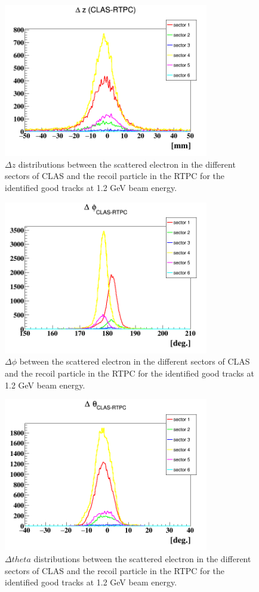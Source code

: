 \begin{figure}[tbp]
\centering
\includegraphics[height=6.7cm]{fig/delta_z_sec.png}
\caption{$\Delta z$ distributions between the scattered electron in the 
different sectors of CLAS and the recoil particle in the RTPC for the 
identified good tracks at 1.2 GeV beam energy.}
\label{fig:delta_z_sec}
 \end{figure}


\begin{figure}[tbp]
\centering
\includegraphics[height=6.7cm]{fig/delta_phi_sec.png}
\caption{ $\Delta \phi$ between the scattered electron in the different sectors 
of CLAS and the recoil particle in the RTPC for the identified good tracks at 
1.2 GeV beam energy.}
\label{fig:delta_phi_sec}
 \end{figure}


\begin{figure}[tbp]
\centering
\includegraphics[height=6.7cm]{fig/delta_theta_sec.png}
\caption{$\Delta theta$ distributions between the scattered electron in the 
different sectors of CLAS and the recoil particle in the RTPC for the 
identified good tracks at 1.2 GeV beam energy.}
\label{fig:delta_theta_sec}
 \end{figure}




